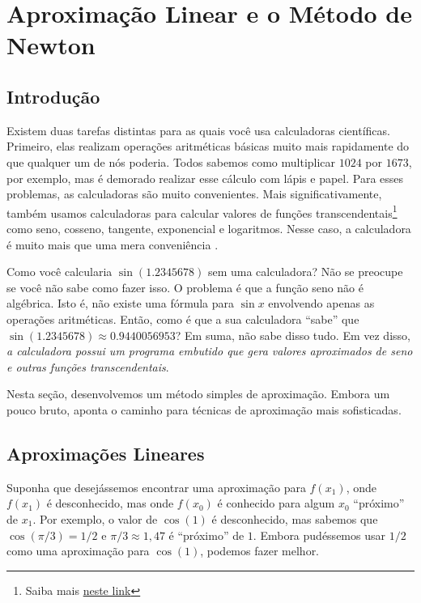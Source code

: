\cleardoublepage\documentclass[../main.tex]{subfiles}
\begin{document}
\chapter{Aproximação Linear e o Método de Newton}\label{apend:MetNewton}

\section{Introdução}
Existem duas tarefas distintas para as quais você usa calculadoras científicas. Primeiro, elas realizam operações aritméticas básicas muito mais rapidamente do que qualquer um de nós poderia. Todos sabemos como multiplicar $1024$ por $1673$, por exemplo,  mas é demorado realizar esse cálculo com lápis e papel. Para esses problemas, as calculadoras são muito convenientes. Mais significativamente, também usamos calculadoras para calcular valores de funções transcendentais\footnote{Saiba mais  \href{https://pt.wikipedia.org/wiki/Função_transcendente}{neste link}} como seno, cosseno, tangente, exponencial e logaritmos. Nesse caso, a calculadora é muito mais que uma mera conveniência \cite{SmithCalculus}.


Como você calcularia $\sin(1.2345678)$ sem uma calculadora? Não se preocupe se você não sabe como fazer isso. O problema é que a função seno não é algébrica. Isto é, não existe uma fórmula para $\sin x$ envolvendo apenas as operações aritméticas. Então, como é que a sua calculadora “sabe” que $\sin(1.2345678) \approx 0 .9440056953$?  Em suma, não sabe disso  tudo. Em vez disso, \textit{a calculadora possui um programa embutido que gera valores aproximados de seno e outras funções transcendentais}.

Nesta seção, desenvolvemos um método simples de aproximação. Embora um pouco bruto, aponta o caminho para técnicas de aproximação mais sofisticadas.

\section{Aproximações Lineares}
Suponha que desejássemos encontrar uma aproximação para $f ( x_1 )$, onde $f (x_1)$ é desconhecido, mas onde
$f (x_0)$ é conhecido para algum $ x_0 $ ``próximo'' de $x_1$. Por exemplo, o valor de $\cos(1)$ é desconhecido, mas
sabemos que $\cos (\pi / 3) = 1/2$  e $\pi / 3 \approx 1,47$ é ``próximo'' de $1$. Embora pudéssemos usar $1/2$ como uma aproximação para $\cos (1)$, podemos fazer melhor.
\end{document}
